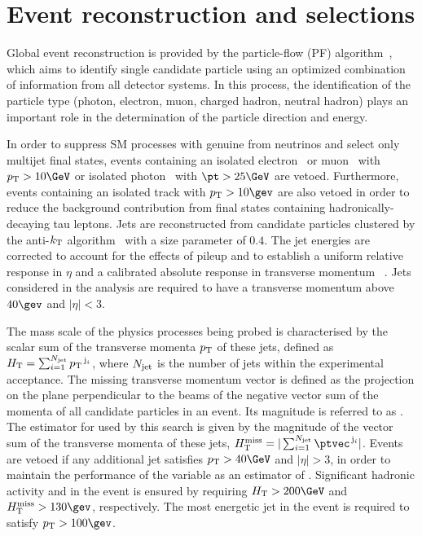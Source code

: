 \section{Event reconstruction and selections} 
\label{sec:event_selection}

Global event reconstruction is provided by the particle-flow (PF)
algorithm~\cite{CMS-PAS-PFT-09-001, CMS-PAS-PFT-10-001}, which aims to
identify single candidate particle using an optimized combination
of information from all detector systems. In this process, the
identification of the particle type (photon, electron, muon, charged
hadron, neutral hadron) plays an important role in the determination
of the particle direction and energy. 

In order to suppress SM processes with genuine \ptvecmiss from
neutrinos and select only multijet final states, events containing an
isolated electron~\cite{PAS-EGM-10-004} or muon~\cite{PAS-MUO-10-004}
with $\Pt > 10\GeV$ or isolated photon~\cite{PAS-EGM-10-006} with $\pt
> 25\GeV$ are vetoed. Furthermore, events containing an isolated track
with $\Pt > 10\gev$ are also vetoed in order to reduce the background
contribution from final states containing hadronically-decaying tau
leptons. Jets are reconstructed from candidate particles clustered by
the anti-$k_{\rm T}$ algorithm~\cite{antikt} with a size parameter of
$0.4$. The jet energies are corrected to account for the effects of
pileup and to establish a uniform relative response in $\eta$ and a
calibrated absolute response in transverse momentum
\pt~\cite{cms-jets}. Jets considered in the analysis are required to
have a transverse momentum above $40\gev$ and $|\eta| < 3$.

The mass scale of the physics processes being probed is characterised
by the scalar sum of the transverse momenta ${p_{\text T}}$ of these jets,
defined as $H_{\mathrm{T}} = \sum_{i=1}^{N_{\rm jet}} {p_{\text T}}^{\,\mathrm{j}_i}$,
where $N_{\rm jet}$ is the number of jets within the experimental
acceptance. The missing transverse momentum vector \ptvecmiss is
defined as the projection on the plane perpendicular to the beams of
the negative vector sum of the momenta of all candidate particles in
an event. Its magnitude is referred to as \ETmiss. The estimator for
\ETmiss used by this search is given by the magnitude of the vector
sum of the transverse momenta of these jets, $\mht =
|\sum_{i=1}^{N_\text{jet}} \ptvec^{\,\mathrm{j}_i}|$. Events are
vetoed if any additional jet satisfies $\Pt > 40\GeV$ and $|\eta| >
3$, in order to maintain the performance of the variable \mht as an
estimator of \ETmiss. Significant hadronic activity and \ptvecmiss in
the event is ensured by requiring $\scalht > 200\GeV$ and $\mht >
130\gev$, respectively. The most energetic jet in the event is
required to satisfy $\Pt > 100\gev$.

